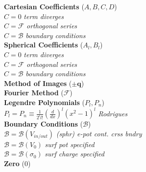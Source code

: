 \documentclass[9pt]{extarticle}
\begin{document}
\begin{multicols}{3}
\textbf{Cartesian Coefficients} ($A, B, C, D$) \\
$C = 0$  \textit{term diverges} \\
$C = \mathcal{F}$ \textit{orthogonal series} \\
$C = \mathcal{B}$ \textit{boundary conditions} \\
\textbf{Spherical Coefficients} ($A_{l}, B_{l}$) \\
$C = 0$  \textit{term diverges} \\
$C = \mathcal{F}$ \textit{orthogonal series} \\
$C = \mathcal{B}$ \textit{boundary conditions} \\
\textbf{Method of Images} ($\pm\mathbf{q}$) \\
\textbf{Fourier Method} ($\mathcal{F}$) \\
\textbf{Legendre Polynomials} ($P_{l}, P_{n}$) \\
$P_{l} = P_{n} \equiv \frac{1}{2^{l}l!}(\frac{d}{dx})^{l}(x^{2}-1)^{l}$ \textit{Rodrigues} \\
\textbf{Boundary Conditions} ($\mathcal{B}$) \\
$\mathcal{B} = \mathcal{B}(V_{in/out})$ \textit{(sphr) e-pot cont. crss bndry} \\
$\mathcal{B} = \mathcal{B}(V_{0})$ \textit{surf pot specified} \\
$\mathcal{B} = \mathcal{B}(\sigma_{0})$ \textit{surf charge specified} \\
\textbf{Zero} ($0$) \\
\end{multicols}
\pagebreak
\end{document}
